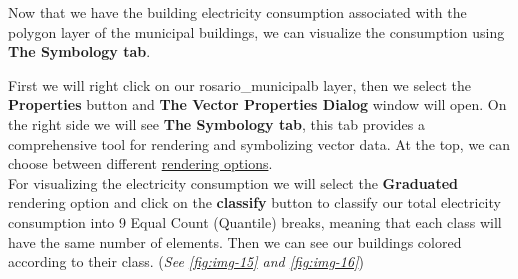 \documentclass[
]{book}
\begin{document}
Now that we have the building electricity consumption associated with the polygon layer of the municipal buildings, we can visualize the consumption using \textbf{The Symbology tab}.

First we will right click on our {rosario\_municipalb} layer, then we select the \textbf{Properties} button and \textbf{The Vector Properties Dialog} window will open. On the right side we will see \textbf{The Symbology tab}, this tab provides a comprehensive tool for rendering and symbolizing vector data. At the top, we can choose between different \href{https://docs.qgis.org/3.16/en/docs/user_manual/working_with_vector/vector_properties.html\#symbology-properties}{rendering options}.\\
For visualizing the electricity consumption we will select the \textbf{Graduated} rendering option and click on the \textbf{classify} button to classify our total electricity consumption into 9 Equal Count (Quantile) breaks, meaning that each class will have the same number of elements. Then we can see our buildings colored according to their class. (\emph{See \ref{fig:img-15} and \ref{fig:img-16}})\\
\end{document}
